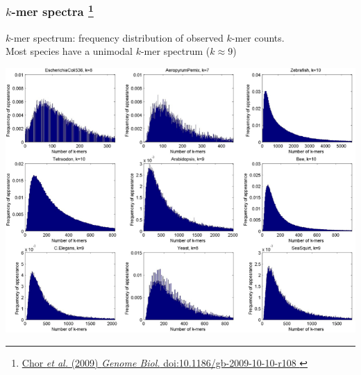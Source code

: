 %
\begin{frame}
  \frametitle{$k$-mer spectra
  \footnote{\tiny{\href{http://dx.doi.org/10.1186/gb-2009-10-10-r108
}{Chor \textit{et al.} (2009) \textit{Genome Biol.} doi:10.1186/gb-2009-10-10-r108
}}}
  }
  \textcolor{RawSienna}{$k$-mer spectrum: frequency distribution of observed $k$-mer counts.} \\
  Most species have a unimodal $k$-mer spectrum ($k\approx9$)
  \begin{center}
    \includegraphics[height=0.6\textheight]{images/kmer_spectra} \\
  \end{center}  
\end{frame}

